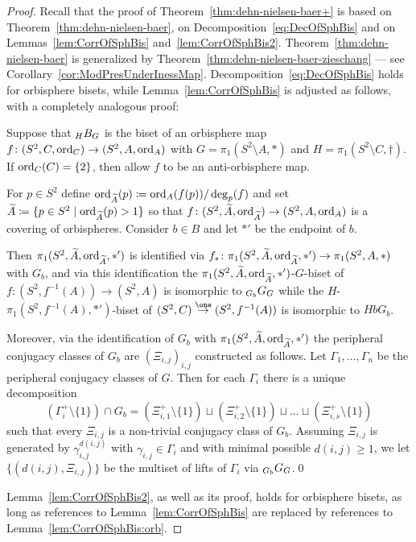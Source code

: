 \documentclass{amsart}
\begin{document}
\begin{proof}
  Recall that the proof of Theorem~\ref{thm:dehn-nielsen-baer+} is
  based on Theorem~\ref{thm:dehn-nielsen-baer}, on
  Decomposition~\eqref{eq:DecOfSphBis} and on
  Lemmas~\ref{lem:CorrOfSphBis} and~\ref{lem:CorrOfSphBis2}.
  Theorem~\ref{thm:dehn-nielsen-baer} is generalized by
  Theorem~\ref{thm:dehn-nielsen-baer-zieschang} --- see
  Corollary~\ref{cor:ModPresUnderInessMap}.
  Decomposition~\eqref{eq:DecOfSphBis} holds for orbisphere bisets,
  while Lemma~\ref{lem:CorrOfSphBis} is adjusted as follows, with a
  completely analogous proof:

  \begin{lem}\label{lem:CorrOfSphBis:orb}
    Suppose that $\subscript H B_G$ is the biset of an orbisphere map
    $f\colon (S^2,C, \operatorname{ord}_C)\to (S^2,A,\operatorname{ord}_A)$ with
    $G=\pi_1(S^2\setminus A,*)$ and $H=\pi_1(S^2\setminus
    C,\dagger)$. If $\operatorname{ord}_C(C)=\{2\}$, then allow $f$ to be an
    anti-orbisphere map.
  
    For $p\in S^2$ define
    $\operatorname{ord}_{\widetilde A}(p)\coloneqq \operatorname{ord}_A(f(p))/\deg_p(f)$ and set
    $\widetilde A\coloneqq \{p\in S^2\mid \operatorname{ord}_{\widetilde A}(p)>1 \}$
    so that
    $f\colon (S^2,\widetilde A,\operatorname{ord}_{\widetilde A})\to (S^2,A,\operatorname{ord}_A)$
    is a covering of orbispheres. Consider $b\in B$ and let $*'$ be
    the endpoint of $b$.

    Then $\pi_1(S^2,\widetilde A,\operatorname{ord}_{\widetilde A}, *')$ is
    identified via
    $f_*\colon \pi_1(S^2,\widetilde A,\operatorname{ord}_{\widetilde A}, *')\to
    \pi_1(S^2,A, *)$ with $G_b$, and via this identification the
    $\pi_1(S^2,\widetilde A,\operatorname{ord}_{\widetilde A},*')$-$G$-biset of
    $f\colon (S^2,f^{-1}(A))\to (S^2,A)$ is isomorphic to
    $\subscript{G_b}G_G$ while the $H$-$\pi_1(S^2,f^{-1}(A),*')$-biset of
    $(S^2,C)\overset{\one}{\rightarrow} (S^2,f^{-1}(A))$ is isomorphic
    to $H b G_b$.
 
    Moreover, via the identification of $G_b$ with
    $\pi_1(S^2,\widetilde A,\operatorname{ord}_{\widetilde A},*')$ the peripheral
    conjugacy classes of $G_b$ are $(\Xi_{i,j})_{i,j}$ constructed as
    follows. Let $\Gamma_1,\dots,\Gamma_n$ be the peripheral conjugacy
    classes of $G$. Then for each $\Gamma_i$ there is a unique
    decomposition
    \begin{equation}\label{eq:SplGamToXi:orb}
      (\Gamma_i^+\setminus \{1\}) \cap G_b = (\Xi^{+}_{i,1}\setminus \{1\})\sqcup (\Xi^{+}_{i,2}\setminus \{1\})\sqcup\dots \sqcup (\Xi^{+}_{i,s}\setminus \{1\}) 
    \end{equation}
    such that every $\Xi_{i,j}$ is a non-trivial conjugacy class of
    $G_b$. Assuming $\Xi_{i,j}$ is generated by
    $\gamma_{i,j}^{d(i,j)}$ with $\gamma_{i,j}\in \Gamma_i$ and with
    minimal possible $d(i,j)\ge 1$, we let $\{(d(i,j), \Xi_{i,j})\}$
    be the multiset of lifts of $\Gamma_i$ via $\subscript{G_b}G_{G}$.\qed
  \end{lem}
  \noindent Lemma~\ref{lem:CorrOfSphBis2}, as well as its proof, holds
  for orbisphere bisets, as long as references to
  Lemma~\ref{lem:CorrOfSphBis} are replaced by references to
  Lemma~\ref{lem:CorrOfSphBis:orb}.


\end{proof}
\end{document}

